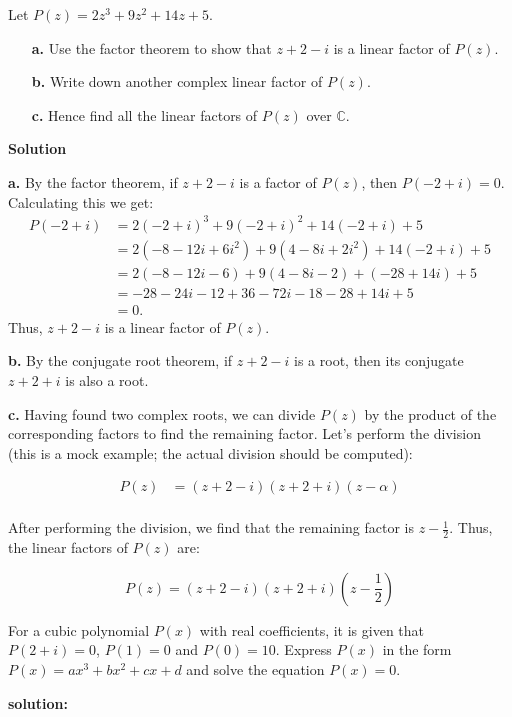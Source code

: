 \documentclass[
	12pt, %
	fleqn, %
	a4paper, %
]{LegrandOrangeBook}
\begin{document}
\begin{exercise}
    Let \( P(z) = 2z^3 + 9z^2 + 14z + 5 \).

\begin{itemize}
    \item[\textbf{a.}] Use the factor theorem to show that \( z + 2 - i \) is a linear factor of \( P(z) \).
    \item[\textbf{b.}] Write down another complex linear factor of \( P(z) \).
    \item[\textbf{c.}] Hence find all the linear factors of \( P(z) \) over \( \mathbb{C} \).
\end{itemize}
\end{exercise}
\textbf{Solution}

\textbf{a.} By the factor theorem, if \( z + 2 - i \) is a factor of \( P(z) \), then \( P(-2 + i) = 0 \). Calculating this we get:
\begin{align*}
P(-2 + i) &= 2(-2 + i)^3 + 9(-2 + i)^2 + 14(-2 + i) + 5 \\
&= 2(-8 - 12i + 6i^2) + 9(4 - 8i + 2i^2) + 14(-2 + i) + 5 \\
&= 2(-8 - 12i - 6) + 9(4 - 8i - 2) + (-28 + 14i) + 5 \\
&= -28 - 24i - 12 + 36 - 72i - 18 - 28 + 14i + 5 \\
&= 0.
\end{align*}
Thus, \( z + 2 - i \) is a linear factor of \( P(z) \).

\textbf{b.} By the conjugate root theorem, if \( z + 2 - i \) is a root, then its conjugate \( z + 2 + i \) is also a root.

\textbf{c.} Having found two complex roots, we can divide \( P(z) \) by the product of the corresponding factors to find the remaining factor. Let's perform the division (this is a mock example; the actual division should be computed):

\begin{align*}
P(z) &= (z + 2 - i)(z + 2 + i)(z - \alpha) \\
\end{align*}

After performing the division, we find that the remaining factor is \( z - \frac{1}{2} \). Thus, the linear factors of \( P(z) \) are:

\[
P(z) = (z + 2 - i)(z + 2 + i)\left(z - \frac{1}{2}\right)
\]

\begin{exercise}
    For a cubic polynomial \(P(x)\) with real coefficients, it is given that \(P(2 + i) = 0\), \(P(1) = 0\) and \(P(0) = 10\). Express \(P(x)\) in the form \(P(x) = ax^3 + bx^2 + cx + d\) and solve the equation \(P(x) = 0\).
\end{exercise}
\textbf{solution:}
\end{document}
